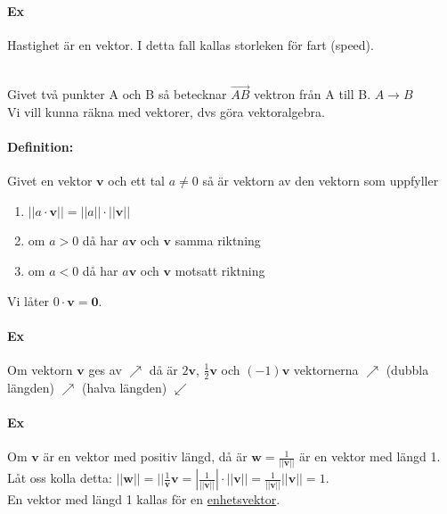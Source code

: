     \paragraph{Ex} Hastighet är en vektor. I detta fall kallas storleken för fart (speed).
    \par
    ~\\
    Givet två punkter A och B så betecknar $\overrightarrow{AB}$ vektron från A till B. $A\longrightarrow B$
    \\Vi vill kunna räkna med vektorer, dvs göra vektoralgebra.
    
    \clearpage

    \paragraph{Definition:} Givet en vektor $\bm{v}$ och ett tal $a\neq 0$ så är vektorn av den vektorn som uppfyller
    \begin{enumerate}
        \item $||a\cdot \bm{v}||=||a||\cdot ||\bm{v}||$
        \item om $a>0$ då har $a\bm{v}$ och $\bm{v}$ samma riktning
        \item om $a<0$ då har $a\bm{v}$ och $\bm{v}$ motsatt riktning
    \end{enumerate}
    Vi låter $0\cdot \bm{v} = \bm{0} $.
    
    \paragraph{Ex} Om vektorn $\bm{v}$ ges av $\nearrow $ då är $2\bm{v}$, $\frac{1}{2}\bm{v}$ och $(-1)\bm{v}$ vektornerna
    $\nearrow$ (dubbla längden) $\nearrow$ (halva längden) $\swarrow $

    \paragraph{Ex} Om $\bm{v}$ är en vektor med positiv längd, då är $\bm{w}=\frac{1}{||\bm{v}||}$ är en vektor med längd 1.
    Låt oss kolla detta: $||\bm{w}|| = ||\frac{1}{\bm{v}}\bm{v}=|\frac{1}{||\bm{v}||}|\cdot ||\bm{v}||=\frac{1}{||\bm{v}||}||\bm{v}||=1$.\\
    En vektor med längd 1 kallas för en \underline{enhetsvektor}.

